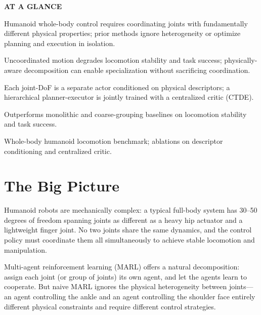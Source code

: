 \documentclass[10pt,twocolumn]{article}
\begin{document}
\begin{mdframed}[backgroundcolor=boxgray,linecolor=rulered,linewidth=1pt,
    innerleftmargin=6pt,innerrightmargin=6pt,
    innertopmargin=6pt,innerbottommargin=6pt]
\textbf{\small AT A GLANCE}\par\vspace{4pt}
\begin{description}[leftmargin=0pt,labelsep=4pt,itemsep=2pt,parsep=0pt,
    font=\small\bfseries]
  \item[Problem:] Humanoid whole-body control requires coordinating joints with fundamentally different physical properties; prior methods ignore heterogeneity or optimize planning and execution in isolation.
  \item[Why it matters:] Uncoordinated motion degrades locomotion stability and task success; physically-aware decomposition can enable specialization without sacrificing coordination.
  \item[Method:] Each joint-DoF is a separate actor conditioned on physical descriptors; a hierarchical planner-executor is jointly trained with a centralized critic (CTDE).
  \item[Result:] Outperforms monolithic and coarse-grouping baselines on locomotion stability and task success.
  \item[Evidence:] Whole-body humanoid locomotion benchmark; ablations on descriptor conditioning and centralized critic.
\end{description}
\end{mdframed}

\section{The Big Picture}

Humanoid robots are mechanically complex: a typical full-body system has 30--50 degrees of freedom spanning joints as different as a heavy hip actuator and a lightweight finger joint.
No two joints share the same dynamics, and the control policy must coordinate them all simultaneously to achieve stable locomotion and manipulation.

Multi-agent reinforcement learning (MARL) offers a natural decomposition: assign each joint (or group of joints) its own agent, and let the agents learn to cooperate.
But naive MARL ignores the physical heterogeneity between joints---an agent controlling the ankle and an agent controlling the shoulder face entirely different physical constraints and require different control strategies.
\end{document}
